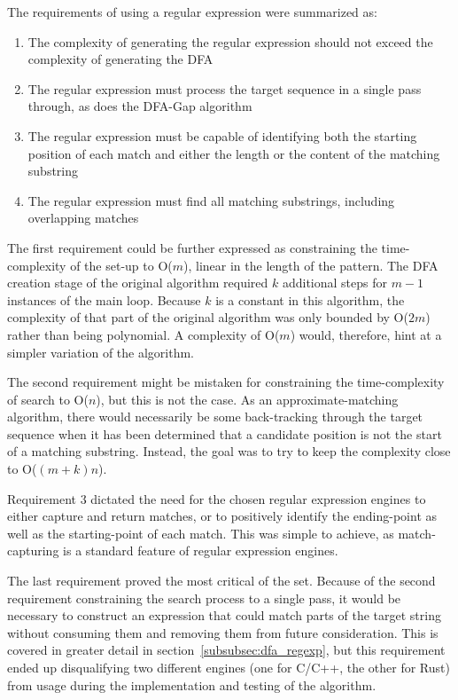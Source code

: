 The requirements of using a regular expression were summarized as:

\begin{enumerate}
\item The complexity of generating the regular expression should not exceed the complexity of generating the DFA
\item The regular expression must process the target sequence in a single pass through, as does the DFA-Gap algorithm
\item The regular expression must be capable of identifying both the starting position of each match and either the length or the content of the matching substring
\item The regular expression must find all matching substrings, including overlapping matches
\end{enumerate}

The first requirement could be further expressed as constraining the time-complexity of the set-up to O($m$), linear in the length of the pattern. The DFA creation stage of the original algorithm required $k$ additional steps for $m-1$ instances of the main loop. Because $k$ is a constant in this algorithm, the complexity of that part of the original algorithm was only bounded by O($2m$) rather than being polynomial. A complexity of O($m$) would, therefore, hint at a simpler variation of the algorithm.

The second requirement might be mistaken for constraining the time-complexity of search to O($n$), but this is not the case. As an approximate-matching algorithm, there would necessarily be some back-tracking through the target sequence when it has been determined that a candidate position is not the start of a matching substring. Instead, the goal was to try to keep the complexity close to O($(m+k)n$).

Requirement 3 dictated the need for the chosen regular expression engines to either capture and return matches, or to positively identify the ending-point as well as the starting-point of each match. This was simple to achieve, as match-capturing is a standard feature of regular expression engines.

The last requirement proved the most critical of the set. Because of the second requirement constraining the search process to a single pass, it would be necessary to construct an expression that could match parts of the target string without consuming them and removing them from future consideration. This is covered in greater detail in section~\ref{subsubsec:dfa_regexp}, but this requirement ended up disqualifying two different engines (one for C/C++, the other for Rust) from usage during the implementation and testing of the algorithm.
